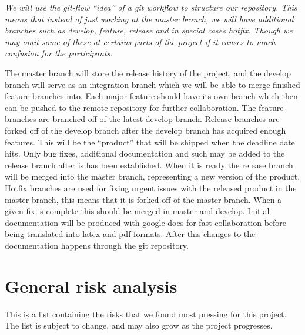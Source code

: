 \documentclass[12pt]{article}%
\begin{document}
\textit{We will use the git-flow “idea” of a git workflow to structure our repository. This means that instead of just working at the master branch, we will have additional branches such as develop, feature, release and in special cases hotfix. Though we may omit some of these at certains parts of the project if it causes to much confusion for the participants.}
\vspace{5mm} %

The master branch will store the release history of the project, and the develop 		branch will serve as an integration branch which we will be able to merge finished 	feature branches into. Each major feature should have its own branch which then can be pushed to the remote repository for further collaboration. The feature branches are branched off of the latest develop branch.
\vspace{5mm} %
    Release branches are forked off of the develop branch after the develop branch has acquired enough features. This will be the “product” that will be shipped when the deadline date hits. Only bug fixes, additional documentation and such may be added to the release branch after is has been established. When it is ready the release branch will be merged into the master branch, representing a new version of the product.
Hotfix branches are used for fixing urgent issues with the released product in the master branch, this means that it is forked off of the master branch. When a given fix is complete this should be merged in master and develop.
\vspace{5mm} %
Initial documentation will be produced with google docs for fast collaboration before being translated into latex and pdf formats. After this changes to the documentation happens through the git repository.



\section{General risk analysis}
This is a list containing the risks that we found most pressing for this project. The list is subject to change, and may also grow as the project progresses.
\end{document}
